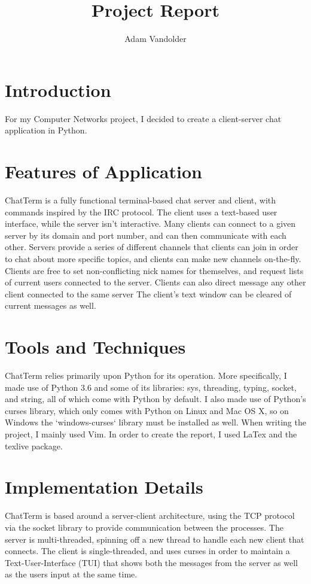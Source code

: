 \documentclass{article}
\title{Project Report}
\author{Adam Vandolder}
\date{}
\begin{document}
	\maketitle
    \tableofcontents
	\newpage
    \linespread{1.6}
    \selectfont

    \section{Introduction}
    For my Computer Networks project, I decided to create a client-server chat
    application in Python.
    \section{Features of Application}
    ChatTerm is a fully functional terminal-based chat server and client, with
    commands inspired by the IRC protocol. The client uses a text-based user
    interface, while the server isn't interactive. Many clients can connect to a
    given server by its domain and port number, and can then communicate with
    each other. Servers provide a series of different channels that clients can
    join in order to chat about more specific topics, and clients can make new
    channels on-the-fly. Clients are free to set non-conflicting nick names for
    themselves, and request lists of current users connected to the server.
    Clients can also direct message any other client connected to the same
    server The client's text window can be cleared of current messages as well.
    \section{Tools and Techniques}
    ChatTerm relies primarily upon Python for its operation.
    More specifically, I made use of Python 3.6 and some of its libraries: sys,
    threading, typing, socket, and string, all of which come with Python by
    default. I also made use of Python's curses library, which only comes with
    Python on Linux and Mac OS X, so on Windows the `windows-curses` library
    must be installed as well. When writing the project, I mainly used Vim. In
    order to create the report, I used LaTex and the texlive package.
    \section{Implementation Details}
    ChatTerm is based around a server-client architecture, using the TCP
    protocol via the socket library to provide communication between the
    processes. The server is multi-threaded, spinning off a new thread to handle
    each new client that connects. The client is single-threaded, and uses
    curses in order to maintain a Text-User-Interface (TUI) that shows both the
    messages from the server as well as the users input at the same time.
\end{document}
